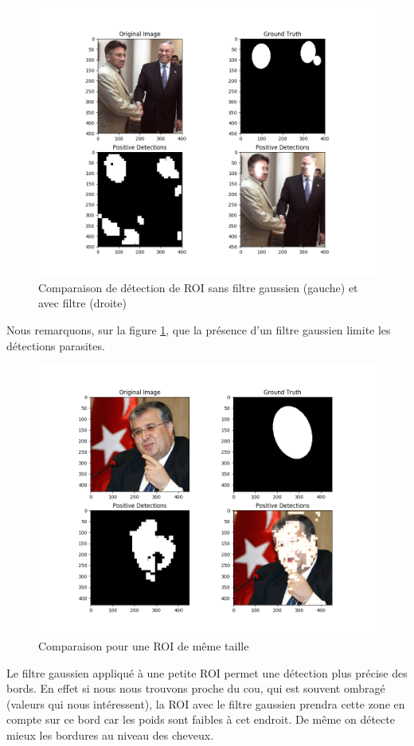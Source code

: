 \documentclass[a4paper,11pt]{article}
\begin{document}
\begin{figure}[H]
\begin{center}
    \includegraphics[scale=0.5]{gaussian_fig1.png}
    \caption{Comparaison de détection de ROI sans filtre gaussien (gauche) et avec
     filtre (droite)}
     \label{fig:gaussian_fig1}
\end{center}
\end{figure}
Nous remarquons, sur la figure \ref{fig:gaussian_fig1}, que la présence d'un filtre gaussien limite les détections parasites.
\begin{figure}[H]
\begin{center}
    \includegraphics[scale=0.5]{gaussian_turc.png}
    \caption{Comparaison pour une ROI de même taille} 
\end{center}
\end{figure}
Le filtre gaussien appliqué à une petite ROI permet une détection plus précise
des bords. En effet si nous nous trouvons proche du cou, qui est souvent
ombragé (valeurs qui nous intéressent), la ROI avec le filtre gaussien prendra cette zone en compte sur ce
bord car les poids sont faibles à cet endroit. De même on détecte mieux les
bordures au niveau des cheveux.
\end{document}
